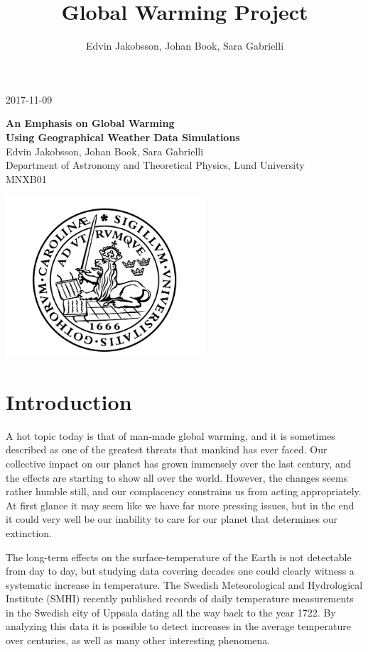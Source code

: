 \documentclass[a4paper]{article}
\title{Global Warming Project}
\author{Edvin Jakobsson, Johan Book, Sara Gabrielli}
\begin{document}
\begin{titlepage}
	\begin{flushright}
		2017-11-09\\
	\end{flushright}
	\vfill
	\begin{center}
		{\huge\bf An Emphasis on Global Warming 
		\\[3mm] 
		\large Using Geographical Weather Data Simulations
		}
		\\[3cm]
		{Edvin Jakobsson, Johan Book, Sara Gabrielli}
		\\[5mm]
		{Department of Astronomy and Theoretical Physics, Lund University}
		\\[2cm]
		{MNXB01}

		\vfill
		\includegraphics[height=6cm]{logo_no_text.png}
	\end{center}
\end{titlepage}

\tableofcontents

\newpage
\section{Introduction}

A hot topic today is that of man-made global warming, and it is sometimes described as one of the greatest threats that mankind has ever faced. Our collective impact on our planet has grown immensely over the last century, and the effects are starting to show all over the world. However, the changes seems rather humble still, and our complacency constrains us from acting appropriately. At first glance it may seem like we have far more pressing issues, but in the end it could very well be our inability to care for our planet that determines our extinction.

The long-term effects on the surface-temperature of the Earth is not detectable from day to day, but studying data covering decades one could clearly witness a systematic increase in temperature. The Swedish Meteorological and Hydrological Institute (SMHI) recently published records of daily temperature measurements in the Swedish city of Uppsala dating all the way back to the year 1722. By analyzing this data it is possible to detect increases in the average temperature over centuries, as well as many other interesting phenomena.
\end{document}

